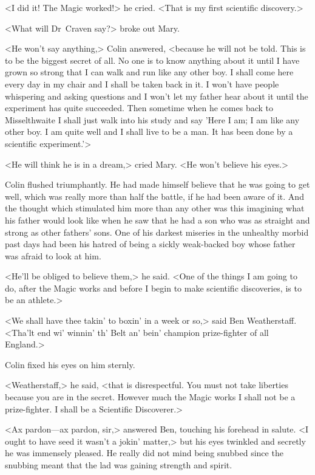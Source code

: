 <I did it! The Magic worked!> he cried. <That is my first scientific discovery.>

<What will Dr~Craven say?> broke out Mary.

<He won't say anything,> Colin answered, <because he will not be told. This is to be the biggest secret of all. No one is to know anything about it until I have grown so strong that I can walk and run like any other boy. I shall come here every day in my chair and I shall be taken back in it. I won't have people whispering and asking questions and I won't let my father hear about it until the experiment has quite succeeded. Then sometime when he comes back to Misselthwaite I shall just walk into his study and say 'Here I am; I am like any other boy. I am quite well and I shall live to be a man. It has been done by a scientific experiment.'>

<He will think he is in a dream,> cried Mary. <He won't believe his eyes.>

Colin flushed triumphantly. He had made himself believe that he was going to get well, which was really more than half the battle, if he had been aware of it. And the thought which stimulated him more than any other was this imagining what his father would look like when he saw that he had a son who was as straight and strong as other fathers' sons. One of his darkest miseries in the unhealthy morbid past days had been his hatred of being a sickly weak-backed boy whose father was afraid to look at him.

<He'll be obliged to believe them,> he said. <One of the things I am going to do, after the Magic works and before I begin to make scientific discoveries, is to be an athlete.>

<We shall have thee takin' to boxin' in a week or so,> said Ben Weatherstaff. <Tha'lt end wi' winnin' th' Belt an' bein' champion prize-fighter of all England.>

Colin fixed his eyes on him sternly.

<Weatherstaff,> he said, <that is disrespectful. You must not take liberties because you are in the secret. However much the Magic works I shall not be a prize-fighter. I shall be a Scientific Discoverer.>

<Ax pardon—ax pardon, sir,> answered Ben, touching his forehead in salute. <I ought to have seed it wasn't a jokin' matter,> but his eyes twinkled and secretly he was immensely pleased. He really did not mind being snubbed since the snubbing meant that the lad was gaining strength and spirit.